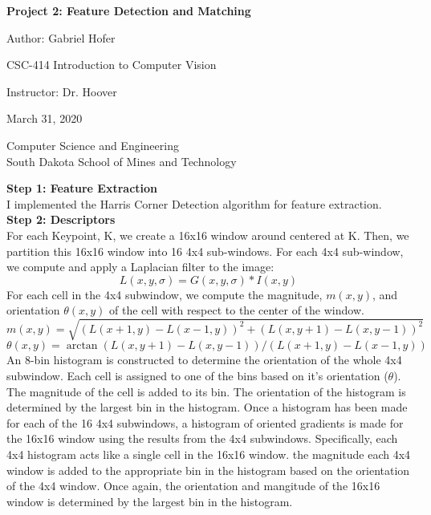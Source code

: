 \documentclass[12pt]{article}
\begin{document}
\begin{titlepage}
   \begin{center}
       \vspace*{1cm}
       \large
       \textbf{Project 2: Feature Detection and Matching}
       \normalsize

       \vspace{0.5cm}

       Author: Gabriel Hofer

       \vspace{0.5cm}

       CSC-414 Introduction to Computer Vision

       \vspace{0.5cm}

       Instructor: Dr. Hoover

       \vspace{0.5cm}

        March 31, 2020

       \vfill

       Computer Science and Engineering\\
       South Dakota School of Mines and Technology\\
   \end{center}
\end{titlepage}
\newpage
\small
\textbf{Step 1: Feature Extraction}\\ 

I implemented the Harris Corner Detection algorithm for feature extraction. \\

\textbf{Step 2: Descriptors}\\

For each Keypoint, K, we create a 16x16 window around centered at K.
Then, we partition this 16x16 window into 16 4x4 sub-windows.
For each 4x4 sub-window, we compute and apply a Laplacian filter to the image:
\[
    L(x,y,\sigma) = G(x,y,\sigma) * I(x,y)
\]
For each cell in the 4x4 subwindow, we compute the magnitude, $m(x,y)$, and orientation
$ \theta (x,y) $ of the cell with respect to the center of the window.
\[
    m(x,y) = \sqrt{(L(x+1,y)-L(x-1,y))^2+(L(x,y+1)-L(x,y-1))^2}
\]
\[
    \theta (x,y) = \arctan{(L(x,y+1)-L(x,y-1))/(L(x+1,y)-L(x-1,y))}
\]
An 8-bin histogram is constructed to determine the orientation of the whole 4x4
subwindow. Each cell is assigned to one of the bins based on it's orientation ($\theta$).
The magnitude of the cell is added to its bin. 
The orientation of the histogram is determined by the largest bin in the histogram.
Once a histogram has been made for each of the 16 4x4 subwindows, a histogram of 
oriented gradients is made for the 16x16 window using the results from the 4x4 subwindows.
Specifically, each 4x4 histogram acts like a single cell in the 16x16 window.
the magnitude each 4x4 window is added to the appropriate bin in the histogram based
on the orientation of the 4x4 window. 
Once again, the orientation and mangitude of the 16x16 window is determined by the 
largest bin in the histogram.
\end{document}
